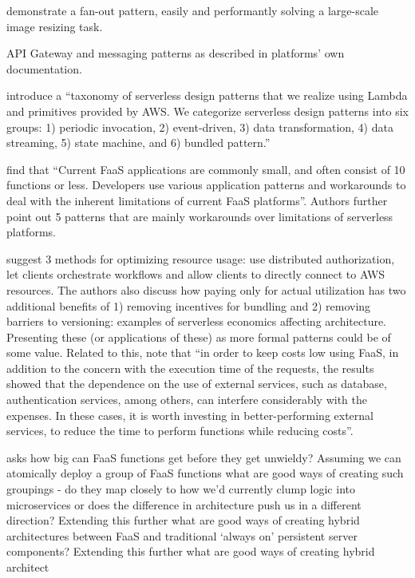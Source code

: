 \textcite{mcgrath16cloudEventParadigms} demonstrate a fan-out pattern, easily and performantly solving a large-scale image resizing task.

API Gateway and messaging patterns as described in platforms' own documentation. \parencite{awslambda0218}

\textcite{hong18securingviaserverlesspatterns} introduce a ``taxonomy of serverless design patterns that we realize using Lambda and primitives provided by AWS. We categorize serverless design patterns into six groups: 1) periodic invocation, 2) event-driven, 3) data transformation, 4) data streaming, 5) state machine, and 6) bundled pattern.''

\textcite{leitner18industrialpractice} find that ``Current FaaS applications are commonly small, and often consist of 10 functions or less. Developers use various application patterns and workarounds to deal with the inherent limitations of current FaaS platforms''. Authors further point out 5 patterns that are mainly workarounds over limitations of serverless platforms.

\textcite{adzic2017serverless} suggest 3 methods for optimizing resource usage: use distributed authorization, let clients orchestrate workflows and allow clients to directly connect to AWS resources. The authors also discuss how paying only for actual utilization has two additional benefits of 1) removing incentives for bundling and 2) removing barriers to versioning: examples of serverless economics affecting architecture. Presenting these (or applications of these) as more formal patterns could be of some value. Related to this, \textcite{albuquerque17faaspaas} note that ``in order to keep costs low using FaaS, in addition to the concern with the execution time of the requests, the results showed that the dependence on the use of external services, such as database, authentication services, among others, can interfere considerably with the expenses. In these cases, it is worth investing in better-performing external services, to reduce the time to perform functions while reducing costs''.

\textcite{robert2016serverlessarchitectures} asks how big can FaaS functions get before they get unwieldy? Assuming we can atomically deploy a group of FaaS functions what are good ways of creating such groupings - do they map closely to how we’d currently clump logic into microservices or does the difference in architecture push us in a different direction? Extending this further what are good ways of creating hybrid architectures between FaaS and traditional ‘always on’ persistent server components? Extending this further what are good ways of creating hybrid architect

